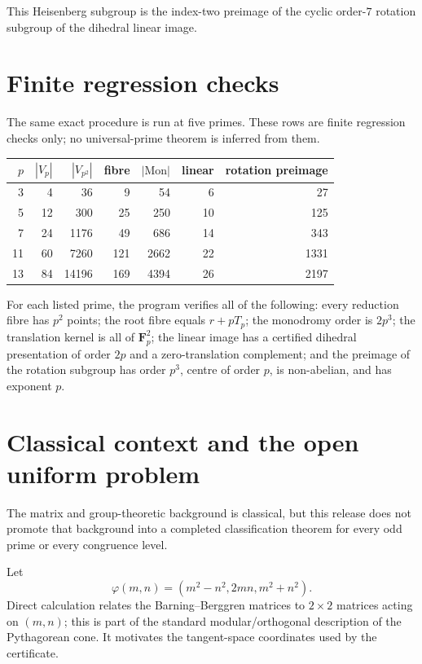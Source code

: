\documentclass[11pt]{article}
\newcommand{\Fp}{\mathbf F_p}
\begin{document}
This Heisenberg subgroup is the index-two preimage of the cyclic order-$7$ rotation subgroup of the dihedral linear image.

\section{Finite regression checks}
The same exact procedure is run at five primes. These rows are finite regression checks only; no universal-prime theorem is inferred from them.

\begin{center}
\begin{tabular}{rrrrrrr}
\toprule
$p$ & $|V_p|$ & $|V_{p^2}|$ & fibre & $|\mathrm{Mon}|$ & linear & rotation preimage\\
\midrule
3  & 4  & 36    & 9   & 54   & 6  & 27\\
5  & 12 & 300   & 25  & 250  & 10 & 125\\
7  & 24 & 1176  & 49  & 686  & 14 & 343\\
11 & 60 & 7260  & 121 & 2662 & 22 & 1331\\
13 & 84 & 14196 & 169 & 4394 & 26 & 2197\\
\bottomrule
\end{tabular}
\end{center}

For each listed prime, the program verifies all of the following: every reduction fibre has $p^2$ points; the root fibre equals $r+pT_p$; the monodromy order is $2p^3$; the translation kernel is all of $\Fp^2$; the linear image has a certified dihedral presentation of order $2p$ and a zero-translation complement; and the preimage of the rotation subgroup has order $p^3$, centre of order $p$, is non-abelian, and has exponent $p$.

\section{Classical context and the open uniform problem}\label{sec:classical}
The matrix and group-theoretic background is classical, but this release does not promote that background into a completed classification theorem for every odd prime or every congruence level.

Let
\[
\varphi(m,n)=(m^2-n^2,2mn,m^2+n^2).
\]
Direct calculation relates the Barning--Berggren matrices to $2\times2$ matrices acting on $(m,n)$; this is part of the standard modular/orthogonal description of the Pythagorean cone. It motivates the tangent-space coordinates used by the certificate.
\end{document}

